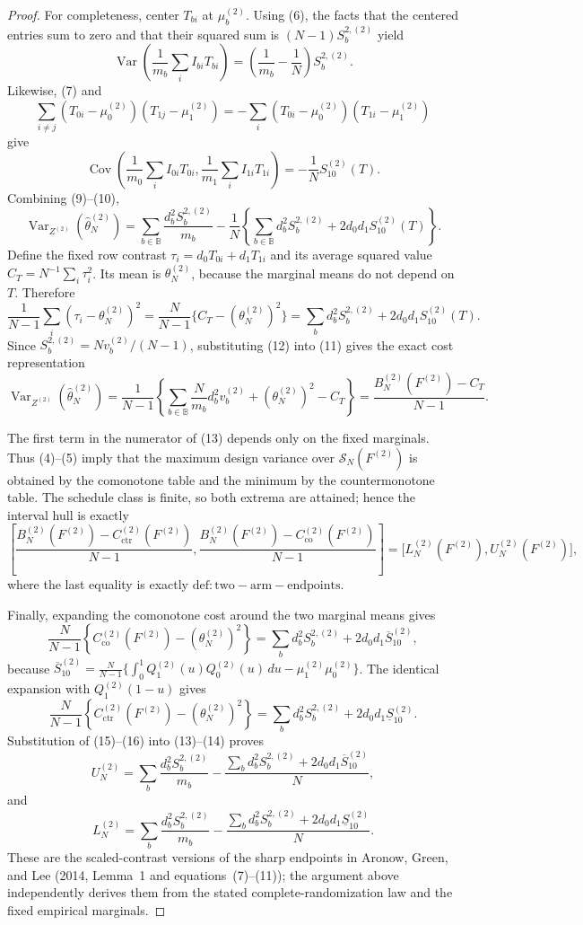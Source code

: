 \documentclass{article}
\begin{document}
\begin{proof}
For completeness, center \(T_{bi}\) at \(\mu_b^{(2)}\).  Using (6), the facts that the centered entries sum to zero and that their squared sum is \((N-1)S_b^{2,(2)}\) yield
\[
\operatorname{Var}\!\left(\frac1{m_b}\sum_i I_{bi}T_{bi}\right)
=\left(\frac1{m_b}-\frac1N\right)S_b^{2,(2)}. \tag{9}
\]
Likewise, (7) and
\[
\sum_{i\ne j}(T_{0i}-\mu_0^{(2)})(T_{1j}-\mu_1^{(2)})
=-\sum_i(T_{0i}-\mu_0^{(2)})(T_{1i}-\mu_1^{(2)})
\]
give
\[
\operatorname{Cov}\!\left(\frac1{m_0}\sum_iI_{0i}T_{0i},
\frac1{m_1}\sum_iI_{1i}T_{1i}\right)
=-\frac1N S_{10}^{(2)}(T). \tag{10}
\]
Combining (9)--(10),
\[
\operatorname{Var}_{Z^{(2)}}(\widehat\theta_N^{(2)})
=\sum_{b\in\mathbb B}\frac{d_b^2S_b^{2,(2)}}{m_b}
-\frac1N\left\{\sum_{b\in\mathbb B}d_b^2S_b^{2,(2)}
+2d_0d_1S_{10}^{(2)}(T)\right\}. \tag{11}
\]
Define the fixed row contrast \(\tau_i=d_0T_{0i}+d_1T_{1i}\) and its average squared value
\(C_T=N^{-1}\sum_i\tau_i^2\).  Its mean is \(\theta_N^{(2)}\), because the marginal means do not depend on \(T\).  Therefore
\[
\frac1{N-1}\sum_i(\tau_i-\theta_N^{(2)})^2
=\frac{N}{N-1}\{C_T-(\theta_N^{(2)})^2\}
=\sum_b d_b^2S_b^{2,(2)}+2d_0d_1S_{10}^{(2)}(T). \tag{12}
\]
Since \(S_b^{2,(2)}=Nv_b^{(2)}/(N-1)\), substituting (12) into (11) gives the exact cost representation
\[
\operatorname{Var}_{Z^{(2)}}(\widehat\theta_N^{(2)})
=\frac{1}{N-1}\left\{
\sum_{b\in\mathbb B}\frac{N}{m_b}d_b^2v_b^{(2)}
+(\theta_N^{(2)})^2-C_T\right\}
=\frac{B_N^{(2)}(F^{(2)})-C_T}{N-1}. \tag{13}
\]

The first term in the numerator of (13) depends only on the fixed marginals.  Thus (4)--(5) imply that the maximum design variance over \(\mathcal S_N(F^{(2)})\) is obtained by the comonotone table and the minimum by the countermonotone table.  The schedule class is finite, so both extrema are attained; hence the interval hull is exactly
\[
\left[
\frac{B_N^{(2)}(F^{(2)})-C_{\mathrm{ctr}}^{(2)}(F^{(2)})}{N-1},
\frac{B_N^{(2)}(F^{(2)})-C_{\mathrm{co}}^{(2)}(F^{(2)})}{N-1}
\right]
=\bigl[L_N^{(2)}(F^{(2)}),U_N^{(2)}(F^{(2)})\bigr], \tag{14}
\]
where the last equality is exactly \(\mathrm{def:two-arm-endpoints}\).

Finally, expanding the comonotone cost around the two marginal means gives
\[
\frac{N}{N-1}\left\{C_{\mathrm{co}}^{(2)}(F^{(2)})-(\theta_N^{(2)})^2\right\}
=\sum_b d_b^2S_b^{2,(2)}+2d_0d_1\overline S_{10}^{(2)}, \tag{15}
\]
because
\(\overline S_{10}^{(2)}=\frac{N}{N-1}\{\int_0^1Q_1^{(2)}(u)Q_0^{(2)}(u)\,du-\mu_1^{(2)}\mu_0^{(2)}\}\).
The identical expansion with \(Q_1^{(2)}(1-u)\) gives
\[
\frac{N}{N-1}\left\{C_{\mathrm{ctr}}^{(2)}(F^{(2)})-(\theta_N^{(2)})^2\right\}
=\sum_b d_b^2S_b^{2,(2)}+2d_0d_1\underline S_{10}^{(2)}. \tag{16}
\]
Substitution of (15)--(16) into (13)--(14) proves
\[
U_N^{(2)}
=\sum_b\frac{d_b^2S_b^{2,(2)}}{m_b}
-\frac{\sum_b d_b^2S_b^{2,(2)}+2d_0d_1\overline S_{10}^{(2)}}{N},
\]
and
\[
L_N^{(2)}
=\sum_b\frac{d_b^2S_b^{2,(2)}}{m_b}
-\frac{\sum_b d_b^2S_b^{2,(2)}+2d_0d_1\underline S_{10}^{(2)}}{N}.
\]
These are the scaled-contrast versions of the sharp endpoints in Aronow, Green, and Lee (2014, Lemma~1 and equations~(7)--(11)); the argument above independently derives them from the stated complete-randomization law and the fixed empirical marginals.
\end{proof}
\end{document}
